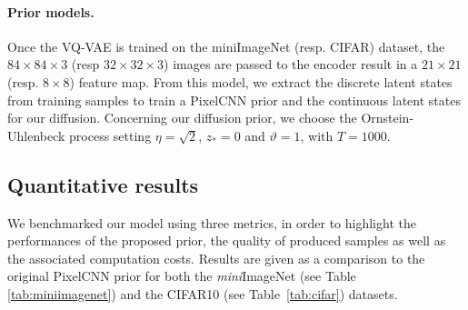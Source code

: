 \documentclass[nohyperref]{article}
\theoremstyle{plain}
\theoremstyle{definition}
\theoremstyle{remark}
\begin{document}
\paragraph{Prior models. }
Once the VQ-VAE is trained on the miniImageNet (resp. CIFAR) dataset, the $84\times 84 \times 3$ (resp $32\times 32 \times 3$) images are passed to the encoder result in a $21 \times 21$ (resp. $8 \times 8$) feature map. From this model, we extract the discrete latent states from training samples to train a PixelCNN prior and the continuous latent states for our diffusion.
Concerning our diffusion prior, we choose the Ornstein-Uhlenbeck process setting $\eta = \sqrt{2}$, $z_*=0$ and $\vartheta = 1$, with $T=1000$. 


\subsection{Quantitative results}
We benchmarked our model using three metrics, in order to highlight the performances of the proposed prior, the quality of produced samples as well as the associated computation costs.
Results are given as a comparison to the original PixelCNN prior for both the \textit{mini}ImageNet (see Table \ref{tab:miniimagenet}) and the CIFAR10 (see Table~\ref{tab:cifar}) datasets.
\end{document}
